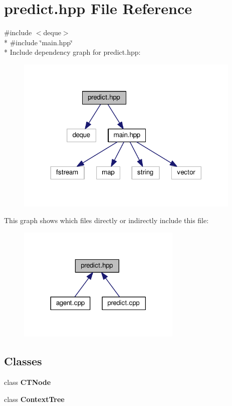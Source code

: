 \section{predict.\+hpp File Reference}
\label{predict_8hpp}
{\ttfamily \#include $<$deque$>$}\\*
{\ttfamily \#include \char`\"{}main.\+hpp\char`\"{}}\\*
Include dependency graph for predict.\+hpp\+:
\nopagebreak
\begin{figure}[H]
\begin{center}
\leavevmode
\includegraphics[width=305pt]{predict_8hpp__incl}
\end{center}
\end{figure}
This graph shows which files directly or indirectly include this file\+:
\nopagebreak
\begin{figure}[H]
\begin{center}
\leavevmode
\includegraphics[width=222pt]{predict_8hpp__dep__incl}
\end{center}
\end{figure}
\subsection*{Classes}
\begin{DoxyCompactItemize}
\item 
class {\bf C\+T\+Node}
\item 
class {\bf Context\+Tree}
\end{DoxyCompactItemize}
